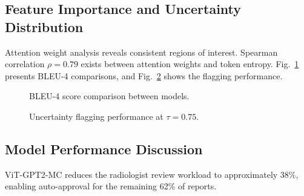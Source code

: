 \documentclass{jcst}
\begin{document}
\subsection{Feature Importance and Uncertainty Distribution}

Attention weight analysis reveals consistent regions of interest. Spearman correlation
$\rho = 0.79$ exists between attention weights and token entropy. Fig.~\ref{fig:bleu} 
presents BLEU-4 comparisons, and Fig.~\ref{fig:flagging} shows the flagging performance.

\begin{figure}[ht]
\centering
{}
\caption{\label{fig:bleu}BLEU-4 score comparison between models.}
\end{figure}

\begin{figure}[ht]
\centering
{}
\caption{\label{fig:flagging}Uncertainty flagging performance at $\tau = 0.75$.}
\end{figure}

\subsection{Model Performance Discussion}

ViT-GPT2-MC reduces the radiologist review workload to approximately 38\%, enabling 
auto-approval for the remaining 62\% of reports.

\end{document}
